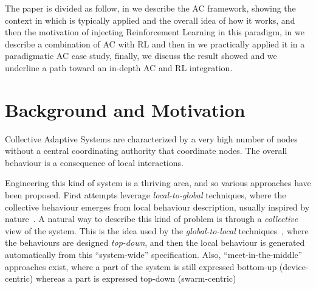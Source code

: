 \documentclass[conference]{IEEEtran}
\begin{document}
The paper is divided as follow, in  we describe
 the AC framework, showing the context in which
 is typically applied and the overall idea of how it works, and then the motivation of injecting Reinforcement Learning in this paradigm,
 in  we describe a combination of AC with RL and then in
  we practically applied it in a paradigmatic AC case study,
 finally,  we discuss the result showed and we underline a path toward an in-depth AC and RL integration.

 \section{Background and Motivation}\label{background}


Collective Adaptive Systems are characterized by a very high number of nodes without a central coordinating authority that coordinate nodes. 
 The overall behaviour is a consequence of local interactions.%
 
Engineering this kind of system is a thriving area, and so various approaches have been proposed.
 First attempts leverage \textit{local-to-global} techniques, where the collective behaviour emerges from local behaviour description, 
 usually inspired by nature~\cite{DBLP:journals/swarm/BrambillaFBD13}. 
%
A natural way to describe this kind of problem is through a \textit{collective} view of the system.
 This is the idea used by the \textit{global-to-local} techniques~\cite{DBLP:journals/jlap/ViroliBDACP19,DBLP:journals/scp/AlrahmanNL20, DBLP:conf/cbse/BuresGHKKP13}, 
 where the behaviours are designed \textit{top-down}, and then the local behaviour is generated automatically from this ``system-wide'' specification. 
% 
Also, ``meet-in-the-middle''~\cite{DBLP:journals/computer/PinciroliB16} approaches exist, where
 a part of the system is still expressed bottom-up (device-centric) whereas a part is expressed top-down (swarm-centric)
\end{document}
